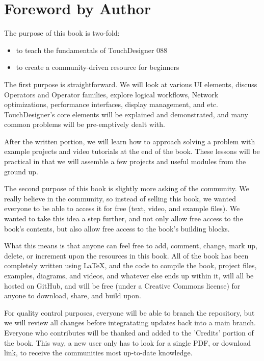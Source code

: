 
\section{Foreword by Author}

\begin{fullwidth}

\vspace{10mm}

The purpose of this book is two-fold:
\begin{itemize}
\item to teach the fundamentals of TouchDesigner 088
\item to create a community-driven resource for beginners
\end{itemize}

The first purpose is straightforward. We will look at various UI elements, discuss Operators and Operator families, explore logical workflows, Network optimizations, performance interfaces, display management, and etc. TouchDesigner's core elements will be explained and demonstrated, and many common problems will be pre-emptively dealt with.

After the written portion, we will learn how to approach solving a problem with example projects and video tutorials at the end of the book. These lessons will be practical in that we will assemble a few projects and useful modules from the ground up.

The second purpose of this book is slightly more asking of the community. We really believe in the community, so instead of selling this book, we wanted everyone to be able to access it for free (text, video, and example files). We wanted to take this idea a step further, and not only allow free access to the book's contents, but also allow free access to the book's building blocks.

What this means is that anyone can feel free to add, comment, change, mark up, delete, or increment upon the resources in this book. All of the book has been completely written using LaTeX, and the code to compile the book, project files, examples, diagrams, and videos, and whatever else ends up within it, will all be hosted on GitHub, and will be free (under a Creative Commons license) for anyone to download, share, and build upon.

For quality control purposes, everyone will be able to branch the repository, but we will review all changes before integratating updates back into a main branch. Everyone who contributes will be thanked and added to the 'Credits' portion of the book. This way, a new user only has to look for a single PDF, or download link, to receive the communities most up-to-date knowledge.


\end{fullwidth}
